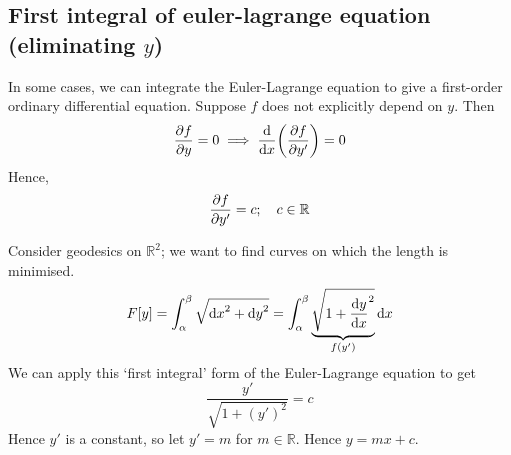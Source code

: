 \subsection{First integral of euler-lagrange equation (eliminating \(y\))}
In some cases, we can integrate the Euler-Lagrange equation to give a first-order ordinary differential equation.
Suppose \(f\) does not explicitly depend on \(y\).
Then
\[
	\pdv{f}{y} = 0 \implies \dv{x}\qty(\pdv{f}{y'}) = 0
\]
Hence,
\[
	\pdv{f}{y'} = c;\quad c \in \mathbb R
\]
\begin{example}
	Consider geodesics on \(\mathbb R^2\); we want to find curves on which the length is minimised.
	\[
		F[y] = \int_\alpha^\beta \sqrt{\dd{x}^2 + \dd{y}^2} = \int_\alpha^\beta \underbrace{\sqrt{1 + \dv{y}{x}^2}}_{f(y')}\dd{x}
	\]
	We can apply this `first integral' form of the Euler-Lagrange equation to get
	\[
		\frac{y'}{\sqrt{1 + (y')^2}} = c
	\]
	Hence \(y'\) is a constant, so let \(y' = m\) for \(m \in \mathbb R\).
	Hence \(y = mx + c\).
\end{example}
